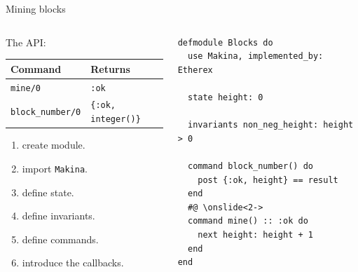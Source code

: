 \documentclass[aspectratio=169, 10pt]{beamer}
\begin{document}
\begin{frame}[label={sec:org4ea25af},fragile]{Mining blocks}
 \begin{columns}
\begin{column}{0.48\columnwidth}
The API:

\begin{center}
\begin{tabular}{ll}
Command & Returns\\
\hline
\texttt{mine/0} & \texttt{:ok}\\
\texttt{block\_number/0} & \texttt{\{:ok, integer()\}}\\
\end{tabular}
\end{center}

\vspace{10pt}
\begin{enumerate}
\item create module.
\item import \texttt{Makina}.
\item define state.
\item define invariants.
\item define commands.
\item introduce the callbacks.
\end{enumerate}
\end{column}

\begin{column}{0.48\columnwidth}
\lstset{language=elixir,label= ,caption= ,captionpos=b,numbers=none,style=display}
\begin{lstlisting}
defmodule Blocks do
  use Makina, implemented_by: Etherex

  state height: 0

  invariants non_neg_height: height > 0

  command block_number() do
    post {:ok, height} == result
  end
  #@ \onslide<2->
  command mine() :: :ok do
    next height: height + 1
  end
end
\end{lstlisting}
\end{column}
\end{columns}
\end{frame}
\end{document}
